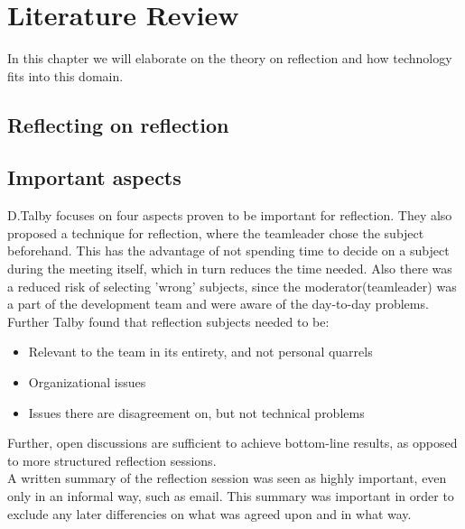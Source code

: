 \section{Literature Review}
\label{sec:literaturereview}
In this chapter we will elaborate on the theory on reflection and how technology fits into this domain. 

\subsection{Reflecting on reflection}
\subsection*{Important aspects}
D.Talby \cite{Talby2006} focuses on four aspects proven to be important for reflection. They also proposed a technique for reflection, where the teamleader chose the subject beforehand. This has the advantage of not spending time to decide on a subject during the meeting itself, which in turn reduces the time needed. Also there was a reduced risk of selecting 'wrong' subjects, since the moderator(teamleader) was a part of the development team and were aware of the day-to-day problems.\\
Further Talby found that reflection subjects needed to be:
\begin{itemize}
\item Relevant to the team in its entirety, and not personal quarrels
\item Organizational issues
\item Issues there are disagreement on, but not technical problems
\end{itemize}
Further, open discussions are sufficient to achieve bottom-line results, as opposed to more structured reflection sessions.\\
A written summary of the reflection session was seen as highly important, even only in an informal way, such as email. This summary was important in order to exclude any later differencies on what was agreed upon and in what way.
